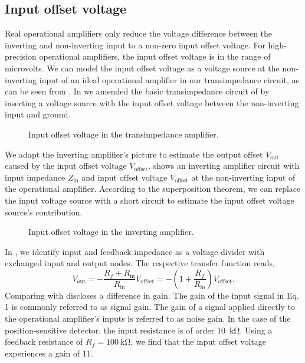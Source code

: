 \subsection{Input offset voltage}

Real operational amplifiers only reduce the voltage difference between the inverting and non-inverting input to a non-zero input offset voltage.
For high-precision operational amplifiers, the input offset voltage is in the range of microvolts.
We can model the input offset voltage as a voltage source at the non-inverting input of an ideal operational amplifier in our transimpedance circuit, as can be seen from .
In  we amended the basic transimpedance circuit of  by inserting a voltage source with the input offset voltage between the non-inverting input and ground.
\begin{figure}[H]
	\centering
	
	\caption{Input offset voltage in the transimpedance amplifier.}\label{fig:input_offset_voltage_transimpedance}
\end{figure}
We adapt the inverting amplifier's picture to estimate the output offset $V_\text{out}$ caused by the input offset voltage $V_\text{offset}$.
 shows an inverting amplifier circuit with input impedance $Z_\text{in}$ and input offset voltage $V_\text{offset}$ at the non-inverting input of the operational amplifier.
According to the superposition theorem, we can replace the input voltage source with a short circuit to estimate the input offset voltage source's contribution.
\begin{figure}[H]
	\centering
	
	\caption{Input offset voltage in the inverting amplifier.}\label{fig:input_offset_voltage_inverting}
\end{figure}
In , we identify input and feedback impedance as a voltage divider with exchanged input and output nodes.
The respective transfer function reads,
\begin{equation}
	V_\text{out}=-\frac{R_f+R_\text{in}}{R_\text{in}}V_\text{offset}=-\left(1+\frac{R_f}{R_\text{in}}\right)V_\text{offset}
	\label{eq:input_offset_voltage}.
\end{equation}
Comparing  with  discloses a difference in gain.
The gain of the input signal in Eq. 1 is commonly referred to as signal gain. 
The gain of a signal applied directly to the operational amplifier's inputs is referred to as noise gain.
In the case of the position-sensitive detector, the input resistance is of order \SI{10}{\kilo\ohm}.
Using a feedback resistance of $R_f=\SI{100}{\kilo\ohm}$, we find that the input offset voltage experiences a gain of 11.

